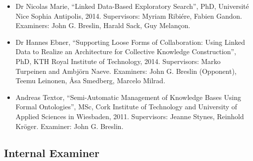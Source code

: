 \documentclass[10pt,a4paper]{res} %
\begin{document}
\begin{resume}
\begin{itemize}
\item Dr Nicolas Marie, ``Linked Data-Based Exploratory Search'', PhD, Universit\'{e} Nice Sophia Antipolis, 2014. Supervisors: Myriam Ribi\'{e}re, Fabien Gandon. Examiners: John G. Breslin, Harald Sack, Guy Melan\c{c}on.
\item Dr Hannes Ebner, ``Supporting Loose Forms of Collaboration: Using Linked Data to Realize an Architecture for Collective Knowledge Construction'', PhD, KTH Royal Institute of Technology, 2014. Supervisors: Marko Turpeinen and Ambj{\"o}rn Naeve. Examiners: John G. Breslin (Opponent), Teemu Leinonen, \r{A}sa Smedberg, Marcelo Milrad.
\item Andreas Textor, ``Semi-Automatic Management of Knowledge Bases Using Formal Ontologies'', MSc, Cork Institute of Technology and University of Applied Sciences in Wiesbaden, 2011. Supervisors: Jeanne Stynes, Reinhold Kr{\"o}ger. Examiner: John G. Breslin.
\end{itemize}

\subsection*{Internal Examiner}


\end{resume}
\end{document}
